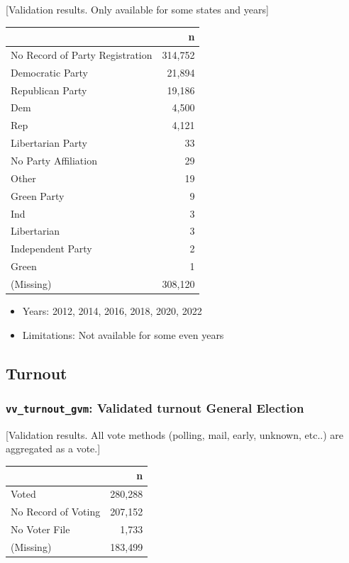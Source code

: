 \documentclass[10pt,article,oneside]{memoir}
\theoremstyle{definition}
\begin{document}
{[}Validation results. Only available for some states and years{]}

\begin{table}[H]
\centering
\begin{tabular}[t]{lr}
\toprule
 & n\\
\midrule
No Record of Party Registration & 314,752\\
Democratic Party & 21,894\\
Republican Party & 19,186\\
Dem & 4,500\\
Rep & 4,121\\
Libertarian Party & 33\\
No Party Affiliation & 29\\
Other & 19\\
Green Party & 9\\
Ind & 3\\
Libertarian & 3\\
Independent Party & 2\\
Green & 1\\
(Missing) & 308,120\\
\bottomrule
\end{tabular}
\end{table}

\begin{itemize}
\tightlist
\item
  Years: 2012, 2014, 2016, 2018, 2020, 2022
\item
  Limitations: Not available for some even years
\end{itemize}

\subsection{Turnout}\label{turnout}

\subsubsection{\texorpdfstring{\texttt{vv\_turnout\_gvm}: Validated
turnout General
Election}{vv\_turnout\_gvm: Validated turnout General Election}}\label{vv_turnout_gvm-validated-turnout-general-election}

{[}Validation results. All vote methods (polling, mail, early, unknown,
etc..) are aggregated as a vote.{]}

\begin{table}[H]
\centering
\begin{tabular}[t]{lr}
\toprule
 & n\\
\midrule
Voted & 280,288\\
No Record of Voting & 207,152\\
No Voter File & 1,733\\
(Missing) & 183,499\\
\bottomrule
\end{tabular}
\end{table}
\end{document}
